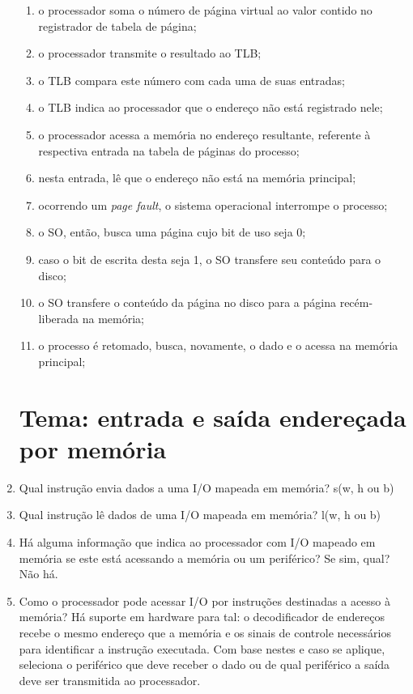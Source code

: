\documentclass{article}
\begin{document}
\begin{enumerate}
\begin{enumerate}
    \item o processador soma o número de página virtual ao valor contido no registrador de tabela de página;
    \item o processador transmite o resultado ao TLB;
    \item o TLB compara este número com cada uma de suas entradas;
    \item o TLB indica ao processador que o endereço não está registrado nele;
    \item o processador acessa a memória no endereço resultante, referente à respectiva entrada na tabela de páginas do processo;
    \item nesta entrada, lê que o endereço não está na memória principal;
    \item ocorrendo um \textit{page fault}, o sistema operacional interrompe o processo;
    \item o SO, então, busca uma página cujo bit de uso seja 0;
    \item caso o bit de escrita desta seja 1, o SO transfere seu conteúdo para o disco;
    \item o SO transfere o conteúdo da página no disco para a página recém-liberada na memória;
    \item o processo é retomado, busca, novamente, o dado e o acessa na memória principal;
\end{enumerate}

\section*{Tema: entrada e saída endereçada por memória}

\item Qual instrução envia dados a uma I/O mapeada em memória? s(w, h ou b)

\item Qual instrução lê dados de uma I/O mapeada em memória? l(w, h ou b)

\item Há alguma informação que indica ao processador com I/O mapeado em memória se este está acessando a memória ou um periférico? Se sim, qual? Não há.

\item Como o processador pode acessar I/O por instruções destinadas a acesso à memória? Há suporte em hardware para tal: o decodificador de endereços recebe o mesmo endereço que a memória e os sinais de controle necessários para identificar a instrução executada. Com base nestes e caso se aplique, seleciona o periférico que deve receber o dado ou de qual periférico a saída deve ser transmitida ao processador.


\end{enumerate}
\end{document}

